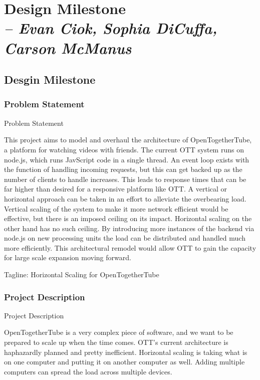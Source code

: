 \chapter{Design Milestone \\
  \small{\textit{-- Evan Ciok, Sophia DiCuffa, Carson McManus}}
  \label{Chapter::designMilestone}}

\section{Desgin Milestone \label{Section::designMilestone}}

\subsection{Problem Statement}
Problem Statement

This project aims to model and overhaul the architecture of OpenTogetherTube, a platform for watching videos with
friends. The current OTT system runs on node.js, which runs JavScript code in a single thread. An event loop exists
with the function of handling incoming requests, but this can get backed up as the number of clients to handle
increases. This leads to response times that can be far higher than desired for a responsive platform like OTT.
A vertical or horizontal approach can be taken in an effort to alleviate the overbearing load. Vertical scaling
of the system to make it more network efficient would be effective, but there is an imposed ceiling on its impact.
Horizontal scaling on the other hand has no such ceiling. By introducing more instances of the backend via
node.js on new processing units the load can be distributed and handled much more efficiently. This architectural
remodel would allow OTT to gain the capacity for large scale expansion moving forward.

Tagline: Horizontal Scaling for OpenTogetherTube

\subsection{Project Description}
Project Description

OpenTogetherTube is a very complex piece of software, and we want to be prepared to scale up when the time comes. OTT's current architecture is haphazardly planned and pretty inefficient.
Horizontal scaling is taking what is on one computer and putting it on another computer as well. Adding multiple computers can spread the load across multiple devices.

